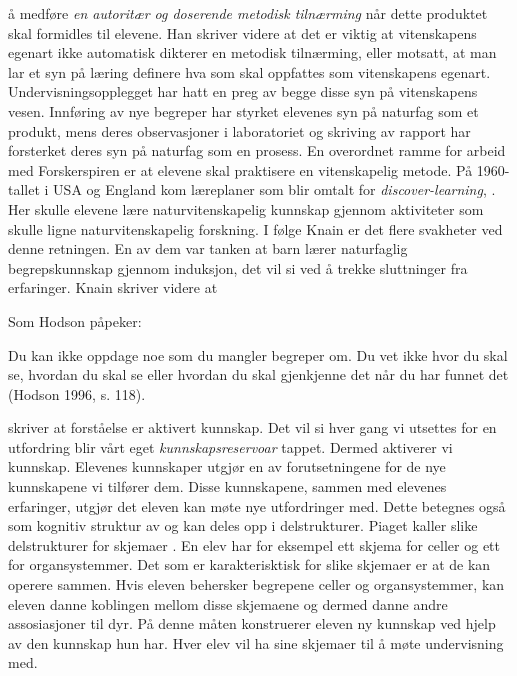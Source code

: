 \documentclass[main.tex]{subfiles}
\begin{document}
å medføre \emph{en autoritær og doserende metodisk tilnærming} når dette produktet skal formidles 
til elevene. \iffalse \citeauthor{sjob04} \else Han \fi skriver videre at det er viktig at 
vitenskapens egenart ikke automatisk dikterer en metodisk tilnærming, eller motsatt, at man lar et 
syn på læring definere hva som skal oppfattes som vitenskapens egenart. Undervisningsopplegget har 
hatt en preg av begge disse syn på vitenskapens vesen. Innføring av nye begreper har styrket 
elevenes syn på naturfag som et produkt, mens deres observasjoner i laboratoriet og skriving av 
rapport har forsterket deres syn på naturfag som en prosess. 
\newline
\newline
En overordnet ramme for arbeid med Forskerspiren er at elevene skal praktisere en vitenskapelig 
metode. På 1960-tallet i USA og England kom læreplaner som blir omtalt
for \emph{discover-learning}, . Her skulle elevene lære naturvitenskapelig 
kunnskap gjennom aktiviteter som skulle ligne naturvitenskapelig forskning. I følge \iffalse 
\citeauthor{knai11} \else Knain \fi  er det flere svakheter ved denne retningen. En av dem var 
tanken at barn lærer naturfaglig begrepskunnskap gjennom induksjon, det vil si ved å trekke 
sluttninger fra erfaringer. \iffalse \citeauthor{knai11} \else Knain \fi skriver videre at
\begin{displayquote}
\guillemotleft Som Hodson påpeker:
\begin{displayquote}
Du kan ikke oppdage noe som du mangler begreper om. Du vet ikke hvor du skal se, hvordan du skal se 
eller hvordan du skal gjenkjenne det når du har funnet det (Hodson 1996, s. 118). \guillemotright
\end{displayquote}
\end{displayquote}
 skriver at forståelse er aktivert kunnskap. Det vil si hver gang vi utsettes 
for en utfordring blir vårt eget \emph{kunnskapsreservoar} tappet. Dermed aktiverer vi kunnskap. 
Elevenes kunnskaper utgjør en av forutsetningene for de nye kunnskapene vi tilfører dem. Disse 
kunnskapene, sammen med elevenes erfaringer, utgjør det eleven kan møte nye utfordringer med. Dette 
betegnes også som kognitiv struktur av \citeauthor{solv92} og kan deles opp i delstrukturer. Piaget 
kaller slike delstrukturer for skjemaer . En elev har for eksempel ett skjema 
for celler og ett for organsystemmer. Det som er karakterisktisk for slike skjemaer er at de kan 
operere sammen. Hvis eleven behersker begrepene celler og organsystemmer, kan eleven danne koblingen
mellom disse skjemaene og dermed danne andre assosiasjoner til dyr. På denne måten konstruerer 
eleven ny kunnskap ved hjelp av den kunnskap hun har. Hver elev vil ha sine skjemaer til å møte 
undervisning med.
\end{document}
